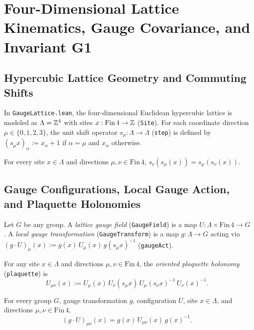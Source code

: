 \section{Four-Dimensional Lattice Kinematics, Gauge Covariance, and Invariant G1}
\label{sec:ch2}

\subsection{Hypercubic Lattice Geometry and Commuting Shifts}
In \texttt{GaugeLattice.lean}, the four-dimensional Euclidean hypercubic lattice is modeled as $\Lambda = \mathbb{Z}^4$ with sites $x : \mathrm{Fin}\,4 \to \mathbb{Z}$ (\texttt{Site}). For each coordinate direction $\mu \in \{0, 1, 2, 3\}$, the unit shift operator $s_\mu : \Lambda \to \Lambda$ (\texttt{step}) is defined by $(s_\mu x)_\alpha := x_\alpha + 1$ if $\alpha = \mu$ and $x_\alpha$ otherwise.

\begin{lemma}
For every site $x \in \Lambda$ and directions $\mu, \nu \in \mathrm{Fin}\,4$, $s_\nu(s_\mu(x)) = s_\mu(s_\nu(x))$.
\end{lemma}

\subsection{Gauge Configurations, Local Gauge Action, and Plaquette Holonomies}
Let $G$ be any group. A \emph{lattice gauge field} (\texttt{GaugeField}) is a map $U : \Lambda \times \mathrm{Fin}\,4 \to G$. A \emph{local gauge transformation} (\texttt{GaugeTransform}) is a map $g : \Lambda \to G$ acting via $(g \cdot U)_\mu(x) := g(x) \, U_\mu(x) \, g(s_\mu x)^{-1}$ (\texttt{gaugeAct}).

For any site $x \in \Lambda$ and directions $\mu, \nu \in \mathrm{Fin}\,4$, the \emph{oriented plaquette holonomy} (\texttt{plaquette}) is
\begin{equation}
U_{\mu\nu}(x) := U_\mu(x) \, U_\nu(s_\mu x) \, U_\mu(s_\nu x)^{-1} \, U_\nu(x)^{-1}.
\end{equation}

\begin{theorem}
\label{thm:plaquette_covariant}
For every group $G$, gauge transformation $g$, configuration $U$, site $x \in \Lambda$, and directions $\mu, \nu \in \mathrm{Fin}\,4$,
\begin{equation}
(g \cdot U)_{\mu\nu}(x) = g(x) \, U_{\mu\nu}(x) \, g(x)^{-1}.
\end{equation}
\end{theorem}

